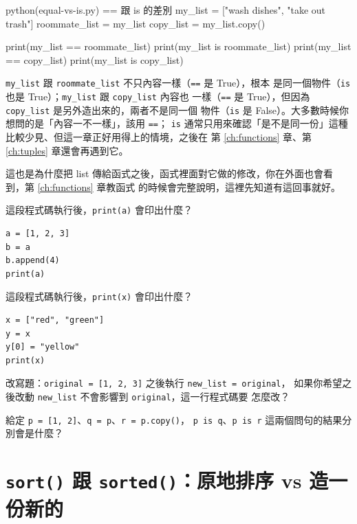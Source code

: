 \begin{example}{python}{(equal-vs-is.py) == 跟 is 的差別}
my_list = ["wash dishes", "take out trash"]
roommate_list = my_list
copy_list = my_list.copy()

print(my_list == roommate_list)
print(my_list is roommate_list)
print(my_list == copy_list)
print(my_list is copy_list)
\end{example}


\texttt{my\_list} 跟 \texttt{roommate\_list} 不只內容一樣（\texttt{==} 是 True），根本
是同一個物件（\texttt{is} 也是 True）；\texttt{my\_list} 跟 \texttt{copy\_list} 內容也
一樣（\texttt{==} 是 True），但因為 \texttt{copy\_list} 是另外造出來的，兩者不是同一個
物件（\texttt{is} 是 False）。大多數時候你想問的是「內容一不一樣」，該用 \texttt{==}；
\texttt{is} 通常只用來確認「是不是同一份」這種比較少見、但這一章正好用得上的情境，之後在
第 \ref{ch:functions} 章、第 \ref{ch:tuples} 章還會再遇到它。

這也是為什麼把 list 傳給函式之後，函式裡面對它做的修改，你在外面也會看到，第 \ref{ch:functions} 章教函式
的時候會完整說明，這裡先知道有這回事就好。

\begin{drills}[label=drills:aliasing]
\item 這段程式碼執行後，\texttt{print(a)} 會印出什麼？
\begin{verbatim}
a = [1, 2, 3]
b = a
b.append(4)
print(a)
\end{verbatim}
\item 這段程式碼執行後，\texttt{print(x)} 會印出什麼？
\begin{verbatim}
x = ["red", "green"]
y = x
y[0] = "yellow"
print(x)
\end{verbatim}
\item 改寫題：\texttt{original = [1, 2, 3]} 之後執行 \texttt{new\_list = original}，
如果你希望之後改動 \texttt{new\_list} 不會影響到 \texttt{original}，這一行程式碼要
怎麼改？
\item 給定 \texttt{p = [1, 2]}、\texttt{q = p}、\texttt{r = p.copy()}，
\texttt{p is q}、\texttt{p is r} 這兩個問句的結果分別會是什麼？
\end{drills}

\section{\texttt{sort()} 跟 \texttt{sorted()}：原地排序 vs 造一份新的}
\label{sec:sort-vs-sorted}

